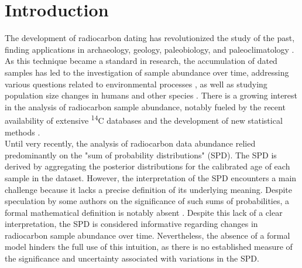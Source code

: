 \documentclass[a4paper]{article}
\begin{document}
\beginingpreprint

\linenumbers


\section*{\centering Introduction}


The development of radiocarbon dating \parencite{Libby1949} has revolutionized the study of the past, finding applications in archaeology, geology, paleobiology, and paleoclimatology \parencite{Taylor1995,BronkRamsey2008,Carleton2021}. As this technique became a standard in research, the accumulation of dated samples has led to the investigation of sample abundance over time, addressing various questions related to environmental processes \parencite[\emph{e.g.} changes in sea level, forest fire frequency, or fluvial activity;][]{Geyh1980, Pierce2004, Thorndycraft2006}, as well as studying population size changes in humans and other species \parencite[\emph{e.g.}][]{Rick1987,Broughton2018}. There is a growing interest in the analysis of radiocarbon sample abundance, notably fueled by the recent availability of extensive \textsuperscript{14}C databases \parencite[e.g.][]{Bird2022} and the development of new statistical methods \parencite[reviewed in][]{Crema2022}.
\\


Until very recently, the analysis of radiocarbon data abundance relied predominantly on the "sum of probability distributions" (SPD). The SPD is derived by aggregating the posterior distributions for the calibrated age of each sample in the dataset. However, the interpretation of the SPD encounters a main challenge because it lacks a precise definition of its underlying meaning. Despite speculation by some authors on the significance of such sums of probabilities, a formal mathematical definition is notably absent \parencite[\emph{e.g.}][; also see the supplementary text~\ref{supplementary_text}]{Carleton2021,Crema2022}. Despite this lack of a clear interpretation, the SPD is considered informative regarding changes in radiocarbon sample abundance over time. Nevertheless, the absence of a formal model hinders the full use of this intuition, as there is no established measure of the significance and uncertainty associated with variations in the SPD.
\\
\end{document}

